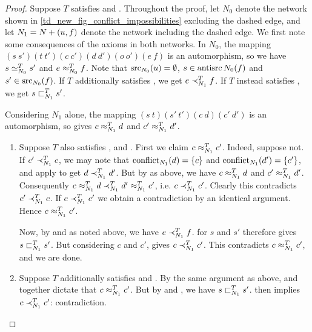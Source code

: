 \begin{proof}
    Suppose $T$ satisfies \symmetry{} and \claimcoherence{}.
    Throughout the proof, let $N_0$ denote the network shown in
    \cref{td_new_fig_conflict_impossibilities} excluding the dashed edge, and
    let $N_1 = {N} + ({u}, {f})$ denote the network including the dashed
    edge. We first note some consequences of the axioms in both networks. In
    $N_0$, the mapping $(s\ s')(t\ t')(c\ c')(d\ d')(o\ o')(e\ f)$ is an
    automorphism, so we have $s \simeq_{N_0}^T s'$ and $e \approx_{N_0}^T f$. Note
    that $\operatorname{src}_{N_0}(u) = \emptyset$, $s \in \operatorname{antisrc}{N_0}(f)$ and $s' \in
    \operatorname{src}_{N_0}(f)$. If $T$ additionally satisfies \freshposresp{}, we get $e
    \prec_{N_1}^T f$. If $T$ instead satisfies \sourceposresp{}, we get $s
    \sqsubset_{N_1}^T s'$.

    Considering $N_1$ alone, the mapping $(s\ t)(s'\ t')(c\ d)(c'\ d')$ is an
    automorphism, so \symmetry{} gives $c \approx_{N_1}^T d$ and $c' \approx_{N_1}^T
    d'$.

    \begin{enumerate}

        \item Suppose $T$ also satisfies \freshposresp{}, \sourcecoherence{}
              and \conflictcoherence{}. First we claim $c \approx_{N_1}^T c'$.
              Indeed, suppose not. If $c' \prec_{N_1}^T c$, we may note that
              $\operatorname{conflict}_{N_1}(d) = \{c\}$ and $\operatorname{conflict}_{N_1}(d') = \{c'\}$,
              and apply \conflictcoherence{} to get $d \prec_{N_1}^T d'$. But by
              \symmetry{} as above, we have $c \approx_{N_1}^T d$ and $c'
              \approx_{N_1}^T d'$. Consequently $c \approx_{N_1}^T d \prec_{N_1}^T d'
              \approx_{N_1}^T c'$, i.e. $c \prec_{N_1}^T c'$. Clearly this
              contradicts $c' \prec_{N_1}^T c$. If $c \prec_{N_1}^T c'$ we obtain
              a contradiction by an identical argument. Hence $c \approx_{N_1}^T
              c'$.

              Now, by \freshposresp{} and \symmetry{} as noted above, we have
              $e \prec_{N_1}^T f$. \sourcecoherence{} for $s$ and $s'$ therefore
              gives $s \sqsubset_{N_1}^T s'$. But considering $c$ and $c'$,
              \claimcoherence{} gives $c \prec_{N_1}^T c'$. This contradicts $c
              \approx_{N_1}^T c'$, and we are done.

        \item Suppose $T$ additionally satisfies \sourceposresp{} and
              \conflictcoherence{}. By the same argument as above,
              \conflictcoherence{} and \symmetry{} together dictate that $c
              \approx_{N_1}^T c'$. But by \symmetry{} and \sourceposresp{}, we
              have $s \sqsubset_{N_1}^T s'$. \claimcoherence{} then implies $c
              \prec_{N_1}^T c'$: contradiction.


\end{enumerate}
\end{proof}
